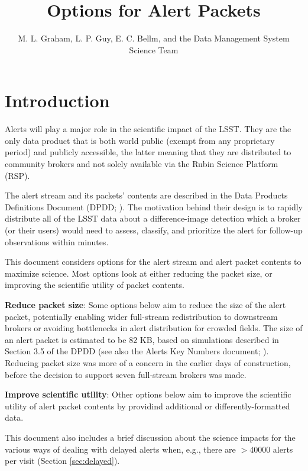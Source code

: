 \documentclass[DM,authoryear,toc]{lsstdoc}
\title{Options for Alert Packets}
\author{%
M. L. Graham, L. P. Guy, E. C. Bellm, and the Data Management System Science Team
}
\date{\vcsDate}
\begin{document}
\maketitle


\section{Introduction}\label{sec:introduction}

Alerts will play a major role in the scientific impact of the LSST.
They are the only data product that is both world public (exempt from any proprietary period) and publicly accessible,
the latter meaning that they are distributed to community brokers and not solely available via the Rubin Science Platform (RSP).

The alert stream and its packets' contents are described in the Data Products Definitions Document (DPDD; ).
The motivation behind their design is to rapidly distribute all of the LSST data about a difference-image detection which a broker (or their users) would need to assess, classify, and prioritize the alert for follow-up observations within minutes.

This document considers options for the alert stream and alert packet contents to maximize science.
Most options look at either reducing the packet size, or improving the scientific utility of packet contents.

\textbf{Reduce packet size}:
Some options below aim to reduce the size of the alert packet, potentially enabling wider full-stream redistribution to downstream brokers or avoiding bottlenecks in alert distribution for crowded fields.
The size of an alert packet is estimated to be 82 KB, based on simulations described in Section 3.5 of the DPDD (see also the Alerts Key Numbers document; ).
Reducing packet size was more of a concern in the earlier days of construction, before the decision to support seven full-stream brokers was made.

\textbf{Improve scientific utility}:
Other options below aim to improve the scientific utility of alert packet contents by providind additional or differently-formatted data.

This document also includes a brief discussion about the science impacts for the various ways of dealing with delayed alerts when, e.g., there are $>$40000 alerts per visit (Section \ref{sec:delayed}).
\end{document}
